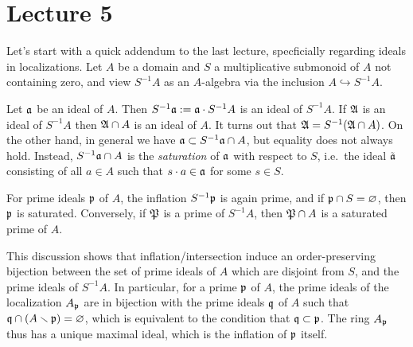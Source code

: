 \section{Lecture 5}

Let's start with a quick addendum to the last lecture, specficially regarding ideals in localizations.
Let $A$ be a domain and $S$ a multiplicative submonoid of $A$ not containing zero, and view $S^{-1}A$ as an $A$-algebra via the inclusion $A \hookrightarrow S^{-1}A$.

Let $\mathfrak{a}$ be an ideal of $A$.
Then $S^{-1}\mathfrak{a} := \mathfrak{a} \cdot S^{-1}A$ is an ideal of $S^{-1}A$.
If $\mathfrak{A}$ is an ideal of $S^{-1}A$ then $\mathfrak{A} \cap A$ is an ideal of $A$.
It turns out that $\mathfrak{A} = S^{-1}(\mathfrak{A} \cap A)$.
On the other hand, in general we have $\mathfrak{a} \subset S^{-1}\mathfrak{a} \cap A$, but equality does not always hold.
Instead, $S^{-1}\mathfrak{a} \cap A$ is the \emph{saturation} of $\mathfrak{a}$ with respect to $S$, i.e.~the ideal $\tilde {\mathfrak{a}}$ consisting of all $a \in A$ such that $s \cdot a \in \mathfrak{a}$ for some $s \in S$.

For prime ideals $\mathfrak{p}$ of $A$, the inflation $S^{-1}\mathfrak{p}$ is again prime, and if $\mathfrak{p} \cap S = \varnothing$, then $\mathfrak{p}$ is saturated.
Conversely, if $\mathfrak{P}$ is a prime of $S^{-1}A$, then $\mathfrak{P} \cap A$ is a saturated prime of $A$.

This discussion shows that inflation/intersection induce an order-preserving bijection between the set of prime ideals of $A$ which are disjoint from $S$, and the prime ideals of $S^{-1}A$.
In particular, for a prime $\mathfrak{p}$ of $A$, the prime ideals of the localization $A_{\mathfrak{p}}$ are in bijection with the prime ideals $\mathfrak{q}$ of $A$ such that $\mathfrak{q} \cap (A \smallsetminus \mathfrak{p}) = \varnothing$, which is equivalent to the condition that $\mathfrak{q} \subset \mathfrak{p}$.
The ring $A_{\mathfrak{p}}$ thus has a unique maximal ideal, which is the inflation of $\mathfrak{p}$ itself.

